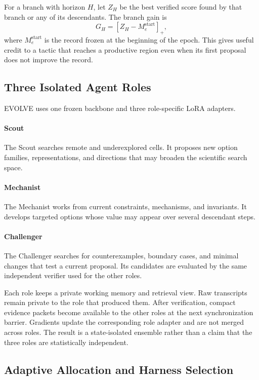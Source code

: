 For a branch with horizon $H$, let $Z_H$ be the best verified score found by that branch or any of its descendants. The branch gain is
\begin{equation}
G_H
=
\left[Z_H-M_e^{\mathrm{start}}\right]_+,
\label{eqbranchgain}
\end{equation}
where $M_e^{\mathrm{start}}$ is the record frozen at the beginning of the epoch. This gives useful credit to a tactic that reaches a productive region even when its first proposal does not improve the record.

\subsection{Three Isolated Agent Roles}
\label{secagents}

EVOLVE uses one frozen backbone and three role-specific LoRA adapters.

\paragraph{Scout}
The Scout searches remote and underexplored cells. It proposes new option families, representations, and directions that may broaden the scientific search space.

\paragraph{Mechanist}
The Mechanist works from current constraints, mechanisms, and invariants. It develops targeted options whose value may appear over several descendant steps.

\paragraph{Challenger}
The Challenger searches for counterexamples, boundary cases, and minimal changes that test a current proposal. Its candidates are evaluated by the same independent verifier used for the other roles.

Each role keeps a private working memory and retrieval view. Raw transcripts remain private to the role that produced them. After verification, compact evidence packets become available to the other roles at the next synchronization barrier. Gradients update the corresponding role adapter and are not merged across roles. The result is a state-isolated ensemble rather than a claim that the three roles are statistically independent.

\subsection{Adaptive Allocation and Harness Selection}
\label{secscheduler}

